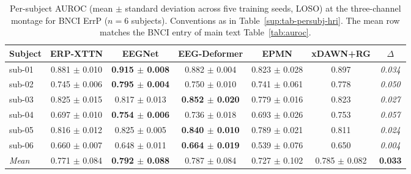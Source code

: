 \begin{table}[t]
\centering
\caption{%
Per-subject AUROC (mean $\pm$ standard deviation across five training seeds, LOSO) at the three-channel montage for BNCI ErrP ($n = 6$ subjects). Conventions as in Table~\ref{sup:tab-persubj-hri}. The mean row matches the BNCI entry of main text Table~\ref{tab:auroc}.%
}
\label{sup:tab-persubj-bnci}
\begin{tabular}{lcccccc}
\toprule
Subject & ERP-XTTN & EEGNet & EEG-Deformer & EPMN & xDAWN+RG & $\Delta$ \\
\midrule
sub-01 & 0.881 $\pm$ 0.010 & \textbf{0.915 $\pm$ 0.008} & 0.882 $\pm$ 0.004 & 0.823 $\pm$ 0.028 & 0.897 & \textit{0.034} \\
sub-02 & 0.745 $\pm$ 0.006 & \textbf{0.795 $\pm$ 0.004} & 0.750 $\pm$ 0.010 & 0.741 $\pm$ 0.061 & 0.778 & \textit{0.050} \\
sub-03 & 0.825 $\pm$ 0.015 & 0.817 $\pm$ 0.013 & \textbf{0.852 $\pm$ 0.020} & 0.779 $\pm$ 0.016 & 0.823 & \textit{0.027} \\
sub-04 & 0.697 $\pm$ 0.010 & \textbf{0.754 $\pm$ 0.006} & 0.736 $\pm$ 0.018 & 0.693 $\pm$ 0.026 & 0.753 & \textit{0.057} \\
sub-05 & 0.816 $\pm$ 0.012 & 0.825 $\pm$ 0.005 & \textbf{0.840 $\pm$ 0.010} & 0.789 $\pm$ 0.021 & 0.811 & \textit{0.024} \\
sub-06 & 0.660 $\pm$ 0.007 & 0.648 $\pm$ 0.011 & \textbf{0.664 $\pm$ 0.019} & 0.539 $\pm$ 0.076 & 0.650 & \textit{0.004} \\
\midrule
\textit{Mean} & 0.771 $\pm$ 0.084 & \textbf{0.792 $\pm$ 0.088} & 0.787 $\pm$ 0.084 & 0.727 $\pm$ 0.102 & 0.785 $\pm$ 0.082 & \textbf{0.033} \\
\bottomrule
\end{tabular}
\end{table}

